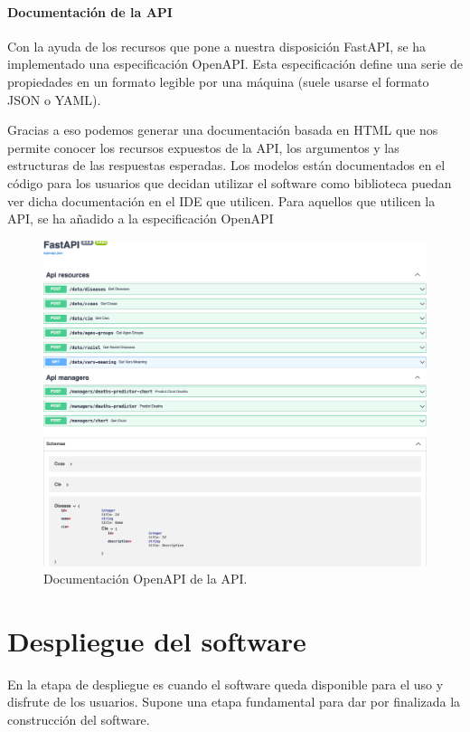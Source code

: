 \subsubsection{Documentación de la API}
Con la ayuda de los recursos que pone a nuestra disposición FastAPI, se ha implementado una especificación OpenAPI. Esta especificación define una serie de propiedades en un formato legible por una máquina (suele usarse el formato JSON o YAML).

Gracias a eso podemos generar una documentación basada en HTML que nos permite conocer los recursos expuestos de la API, los argumentos y las estructuras de las respuestas esperadas. Los modelos están documentados en el código para los usuarios que decidan utilizar el software como biblioteca puedan ver dicha documentación en el IDE que utilicen. Para aquellos que utilicen la API, se ha añadido a la especificación OpenAPI

\begin{figure}[]
	\centering	
	\includegraphics[scale=0.5]{doc/logos/imgs/openapi.png}
	\caption{ \cite{rtve-cis} Documentación OpenAPI de la API. }
    \label{fig:worst_f_value}
\end{figure}



\chapter{Despliegue del software}
En la etapa de despliegue es cuando el software queda disponible para el uso y disfrute de los usuarios. Supone una etapa fundamental para dar por finalizada la construcción del software. 

